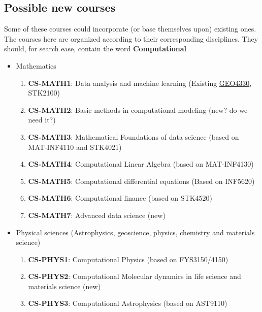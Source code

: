 \documentclass[%
oneside,                 %
final,                   %
10pt]{article}
\begin{document}
\subsection*{Possible new courses}
Some of these courses could incorporate (or base themselves upon) existing ones. The courses here are organized according to their corresponding disciplines. They should, for search ease, contain the word \textbf{Computational} 
\begin{itemize}
\item Mathematics
\begin{enumerate}

\item \textbf{CS-MATH1}: Data analysis and machine learning (Existing \href{{http://www.uio.no/studier/emner/matnat/geofag/GEO4330/}}{GEO4330}, STK2100)

\item \textbf{CS-MATH2}: Basic methods in computational modeling   (new? do we need it?)

\item \textbf{CS-MATH3}: Mathematical Foundations of data science (based on MAT-INF4110 and STK4021)

\item \textbf{CS-MATH4}: Computational Linear Algebra (based on MAT-INF4130)

\item \textbf{CS-MATH5}: Computational differential equations (Based on INF5620)

\item \textbf{CS-MATH6}: Computational finance (based on STK4520)

\item \textbf{CS-MATH7}: Advanced data science (new)

\end{enumerate}

\noindent
\item Physical sciences (Astrophysics, geoscience, physics, chemistry and materials science)
\begin{enumerate}

\item \textbf{CS-PHYS1}: Computational Physics (based on FYS3150/4150)

\item \textbf{CS-PHYS2}: Computational Molecular dynamics in life science and materials science (new)

\item \textbf{CS-PHYS3}: Computational Astrophysics (based on AST9110)


\end{enumerate}
\end{itemize}
\end{document}
